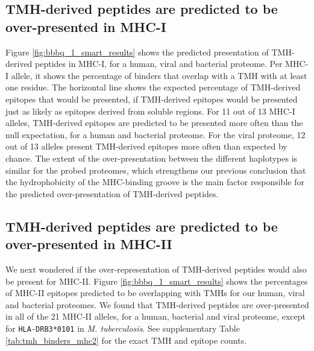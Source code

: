 \subsection{TMH-derived peptides are predicted to be over-presented in MHC-I}

Figure \ref{fig:bbbq_1_smart_results} shows the predicted presentation of TMH-derived peptides in MHC-I,
for a human, viral and bacterial proteome.
Per MHC-I allele, it shows the percentage of binders that overlap with a TMH 
with at least one residue.
The horizontal line shows the expected percentage of TMH-derived epitopes 
that would be presented, if TMH-derived epitopes would be presented just as 
likely as epitopes derived from soluble regions.
For 11 out of 13 MHC-I alleles, TMH-derived epitopes are predicted to be presented more often 
than the null expectation, for a human and bacterial proteome.
For the viral proteome, 12 out of 13 alleles present
TMH-derived epitopes more often than expected by chance.
The extent of the over-presentation between the different haplotypes 
is similar for the probed proteomes, 
which strengthens our previous conclusion \cite{bianchi2017} 
that the hydrophobicity of the MHC-binding groove 
is the main factor responsible for the predicted over-presentation 
of TMH-derived peptides.



\subsection{TMH-derived peptides are predicted to be over-presented in MHC-II}

We next wondered if the over-representation of TMH-derived peptides 
would also be present for MHC-II. 
Figure \ref{fig:bbbq_1_smart_results} shows the percentages of MHC-II epitopes 
predicted to be overlapping with TMHs for our human, viral and bacterial proteomes.
We found that TMH-derived peptides are over-presented in all
of the 21 MHC-II alleles, 
for a human, bacterial and viral proteome,
except for \verb;HLA-DRB3*0101; in \emph{M. tuberculosis}.
See supplementary Table \ref{tab:tmh_binders_mhc2} 
for the exact TMH and epitope counts.

